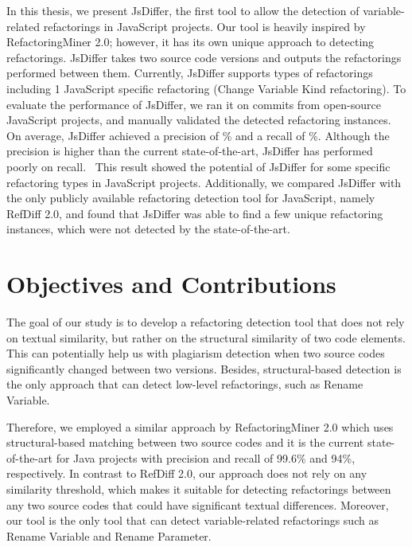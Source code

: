 \documentclass[letterpaper,12pt,onecolumn,final]{report}
\begin{document}
In this thesis, we present JsDiffer, the first tool to allow the detection of variable-related refactorings in JavaScript projects. Our tool is heavily inspired by RefactoringMiner 2.0; however, it has its own unique approach to detecting refactorings. JsDiffer takes two source code versions and outputs the refactorings performed between them. Currently, JsDiffer supports \supportedRefTypesJsDiffer{} types of refactorings including 1 JavaScript specific refactoring (Change Variable Kind refactoring). To evaluate the performance of JsDiffer, we ran it on \evTotalCommits{} commits from \evTotalProjectCounts{} open-source JavaScript projects, and manually validated the detected refactoring instances. On average, JsDiffer achieved a precision of \oraclePrecision{}\% and a recall of \oracleRecall{}\%. Although the precision is higher than the current state-of-the-art, JsDiffer has performed poorly on recall.  This result showed the potential of JsDiffer for some specific refactoring types in JavaScript projects. Additionally, we compared JsDiffer with the only publicly available refactoring detection tool for JavaScript, namely RefDiff 2.0, and found that JsDiffer was able to find a few unique refactoring instances, which were not detected by the state-of-the-art.


\section{Objectives and Contributions}
The goal of our study is to develop a refactoring detection tool that does not rely on textual similarity, but rather on the structural similarity of two code elements. This can potentially help us with plagiarism detection when two source codes significantly changed between two versions. Besides, structural-based detection is the only approach that can detect low-level refactorings, such as Rename Variable.

Therefore, we employed a similar approach by RefactoringMiner 2.0  \cite{Tsantalis2020}  which uses structural-based matching between two source codes and it is the current state-of-the-art for Java projects with precision and recall of 99.6\% and 94\%, respectively. In contrast to RefDiff 2.0, our approach does not rely on any similarity threshold, which makes it suitable for detecting refactorings between any two source codes that could have significant textual differences. Moreover, our tool is the only tool that can detect variable-related refactorings such as Rename Variable and Rename Parameter.
\end{document}
